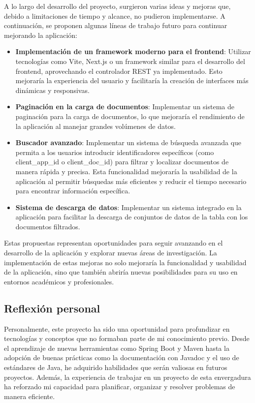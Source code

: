 \documentclass[draft]{scrbook}
\begin{document}
A lo largo del desarrollo del proyecto, surgieron varias ideas y mejoras que, debido a limitaciones de tiempo y alcance, no pudieron implementarse. A continuación, se proponen algunas líneas de trabajo futuro para continuar mejorando la aplicación:

\begin{itemize}
    \item \textbf{Implementación de un framework moderno para el frontend}: Utilizar tecnologías como Vite, Next.js o un framework similar para el desarrollo del frontend, aprovechando el controlador REST ya implementado. Esto mejoraría la experiencia del usuario y facilitaría la creación de interfaces más dinámicas y responsivas.
    
    \item \textbf{Paginación en la carga de documentos}: Implementar un sistema de paginación para la carga de documentos, lo que mejoraría el rendimiento de la aplicación al manejar grandes volúmenes de datos.
    
    \item \textbf{Buscador avanzado}: Implementar un sistema de búsqueda avanzada que permita a los usuarios introducir identificadores específicos (como client\_app\_id o client\_doc\_id) para filtrar y localizar documentos de manera rápida y precisa. Esta funcionalidad mejoraría la usabilidad de la aplicación al permitir búsquedas más eficientes y reducir el tiempo necesario para encontrar información específica.
    
    \item \textbf{Sistema de descarga de datos}: Implementar un sistema integrado en la aplicación para facilitar la descarga de conjuntos de datos de la tabla con los documentos filtrados.
\end{itemize}

Estas propuestas representan oportunidades para seguir avanzando en el desarrollo de la aplicación y explorar nuevas áreas de investigación. La implementación de estas mejoras no solo mejoraría la funcionalidad y usabilidad de la aplicación, sino que también abriría nuevas posibilidades para su uso en entornos académicos y profesionales.

\subsection{Reflexión personal}

Personalmente, este proyecto ha sido una oportunidad para profundizar en tecnologías y conceptos que no formaban parte de mi conocimiento previo. Desde el aprendizaje de nuevas herramientas como Spring Boot y Maven hasta la adopción de buenas prácticas como la documentación con Javadoc y el uso de estándares de Java, he adquirido habilidades que serán valiosas en futuros proyectos. Además, la experiencia de trabajar en un proyecto de esta envergadura ha reforzado mi capacidad para planificar, organizar y resolver problemas de manera eficiente.
\end{document}
